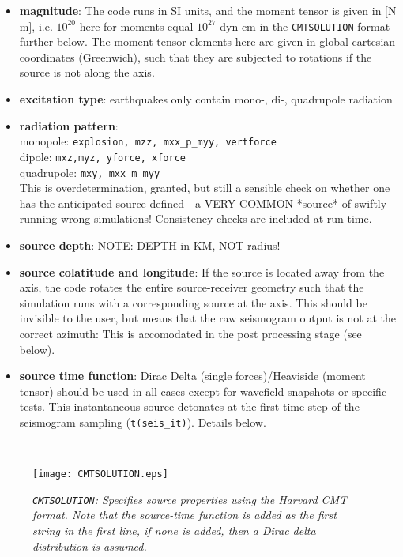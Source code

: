 \documentclass[11pt,letter,fleqn,english,notitlepage]{article}
\begin{document}
\begin{itemize}
    \item  \textbf{magnitude}: The code runs in SI units, and the moment tensor
    is given in [N m], i.e. $10^{20}$ here for moments equal $10^{27}$ dyn cm
    in the {\tt CMTSOLUTION} format further below. The moment-tensor elements
    here are given in global cartesian coordinates (Greenwich), such that they
    are subjected to rotations if the source is not along the axis.

    \item \textbf{excitation type}: earthquakes only contain mono-, di-,
    quadrupole radiation

    \item \textbf{radiation pattern}: \\
    monopole: {\tt explosion, mzz, mxx\_p\_myy, vertforce}\\
    dipole: {\tt mxz,myz, yforce, xforce} \\
    quadrupole: {\tt mxy, mxx\_m\_myy}\\
    This is overdetermination, granted, but still a sensible check on whether 
    one has the anticipated source defined - a VERY COMMON *source* of swiftly 
    running wrong simulations! Consistency checks are included at run time.

    \item \textbf{source depth}: NOTE: DEPTH in KM, NOT radius!

    \item \textbf{source colatitude and longitude}: If the source is located
    away from the axis, the code rotates the entire source-receiver geometry
    such that the simulation runs with a corresponding source at the axis. This
    should be invisible to the user, but means that the raw seismogram output
    is not at the correct azimuth: This is accomodated in the post processing
    stage (see below). 

    \item  \textbf{source time function}: Dirac Delta (single forces)/Heaviside
    (moment tensor) should be used in all cases except for wavefield snapshots
    or specific tests.  This instantaneous source detonates at the first time
    step of the seismogram sampling ({\tt t(seis\_it)}). Details below.
\end{itemize}

\\
\begin{figure*}[htb]
    \begin{center}
        \texttt{[image: CMTSOLUTION.eps]}
        \caption{\textit{{\tt CMTSOLUTION}: Specifies source properties using the Harvard CMT format. Note that the source-time function
        is added as the first string in the first line, if none is added, then a Dirac delta distribution is assumed.}}
    \end{center}
\end{figure*}
\end{document}
